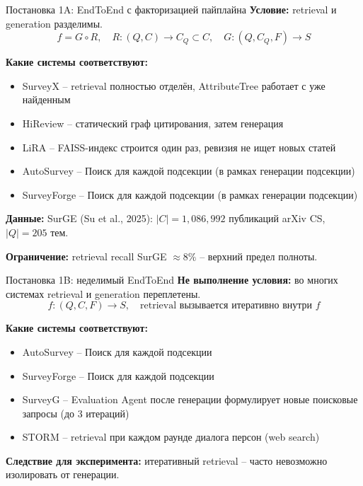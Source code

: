 \documentclass[10pt,aspectratio=169]{beamer}
\begin{document}
\begin{frame}{Постановка 1A: EndToEnd с факторизацией пайплайна}
  \textbf{Условие:} retrieval и generation разделимы.
  \[
    f = G \circ R, \quad R: (Q, C) \to C_Q \subset C, \quad G: (Q, C_Q, F) \to S
  \]

  \textbf{Какие системы соответствуют:}
  \begin{itemize}
    \item SurveyX -- retrieval полностью отделён, AttributeTree работает с уже найденным
    \item HiReview -- статический граф цитирования, затем генерация
    \item LiRA -- FAISS-индекс строится один раз, ревизия не ищет новых статей
    \item AutoSurvey -- Поиск для каждой подсекции (в рамках генерации подсекции)
    \item SurveyForge -- Поиск для каждой подсекции (в рамках генерации подсекции)
  \end{itemize}

  \textbf{Данные:} SurGE (Su et al., 2025): $|C| = 1{,}086{,}992$ публикаций arXiv CS, $|Q| = 205$ тем.

  \textbf{Ограничение:} retrieval recall SurGE $\approx 8\%$ -- верхний предел полноты.
\end{frame}

\begin{frame}{Постановка 1B: неделимый EndToEnd}
  \textbf{Не выполнение условия:} во многих системах retrieval и generation переплетены.
  \[
    f: (Q, C, F) \to S, \quad \text{retrieval вызывается итеративно внутри } f
  \]

  \textbf{Какие системы соответствуют:}
  \begin{itemize}
    \item AutoSurvey -- Поиск для каждой подсекции
    \item SurveyForge -- Поиск для каждой подсекции
    \item SurveyG -- Evaluation Agent после генерации формулирует новые поисковые запросы (до 3 итераций)
    \item STORM -- retrieval при каждом раунде диалога персон (web search)
  \end{itemize}

  \textbf{Следствие для эксперимента:} итеративный retrieval -- часто невозможно изолировать от генерации.
\end{frame}
\end{document}
